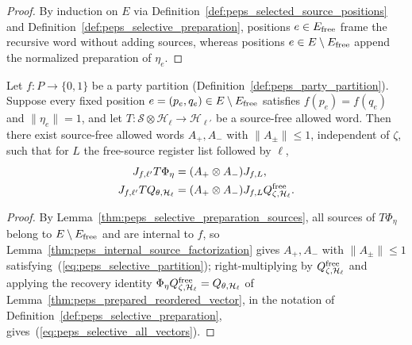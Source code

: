 \begin{proof}
    \leanok
    By induction on $E$ via Definition~\ref{def:peps_selected_source_positions}
    and Definition~\ref{def:peps_selective_preparation}, positions
    $e\in E_{\rm free}$ frame the recursive word without adding sources, whereas
    positions $e\in E\setminus E_{\rm free}$ append the normalized preparation
    of $\eta_e$.
\end{proof}


\begin{lemma}
    \label{thm:peps_selective_partition}
    \leanok
    Let $f:P\to\{0,1\}$ be a party partition (Definition~\ref{def:peps_party_partition}).
    Suppose every fixed position $e=(p_e,q_e)\in E\setminus E_{\rm free}$
    satisfies $f(p_e)=f(q_e)$ and $\|\eta_e\|=1$, and let
    $T:\mathcal S\otimes\mathcal H_\ell\to\mathcal H_{\ell'}$ be a source-free
    allowed word. Then there exist source-free allowed words $A_+,A_-$ with
    $\|A_\pm\|\le 1$, independent of $\zeta$, such that for $L$ the free-source
    register list followed by $\ell$,
    \begin{align}
        J_{f,\ell'}T\Phi_\eta
         & =(A_+\otimes A_-)J_{f,L},
        \label{eq:peps_selective_partition} \\
        J_{f,\ell'}TQ_{\theta,\mathcal H_\ell}
         & =(A_+\otimes A_-)J_{f,L}
        Q^{\rm free}_{\zeta,\mathcal H_\ell}.
        \label{eq:peps_selective_all_vectors}
    \end{align}
\end{lemma}

\begin{proof}
    \leanok
    By Lemma~\ref{thm:peps_selective_preparation_sources}, all sources of
    $T\Phi_\eta$ belong to $E\setminus E_{\rm free}$ and are internal to $f$, so
    Lemma~\ref{thm:peps_internal_source_factorization} gives
    $A_+,A_-$ with $\|A_\pm\|\le 1$ satisfying~(\ref{eq:peps_selective_partition});
    right-multiplying by $Q^{\rm free}_{\zeta,\mathcal H_\ell}$ and applying the recovery identity
    $\Phi_\eta Q^{\rm free}_{\zeta,\mathcal H_\ell}=Q_{\theta,\mathcal H_\ell}$ of
    Lemma~\ref{thm:peps_prepared_reordered_vector}, in the notation of
    Definition~\ref{def:peps_selective_preparation},
    gives~(\ref{eq:peps_selective_all_vectors}).
\end{proof}

